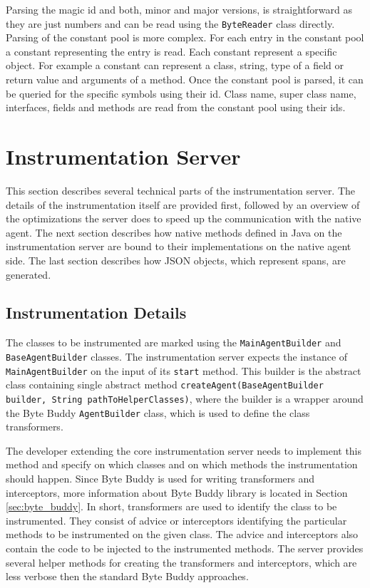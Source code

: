 Parsing the magic id and both, minor and major versions, is straightforward as they are just numbers and can be read using the \texttt{ByteReader} class directly. Parsing of the constant pool is more complex. For each entry in the constant pool a constant representing the entry is read. Each constant represent a specific object. For example a constant can represent a class, string, type of a field or return value and arguments of a method. Once the constant pool is parsed, it can be queried for the specific symbols using their id. Class name, super class name, interfaces, fields and methods are read from the constant pool using their ids.

\section{Instrumentation Server}
This section describes several technical parts of the instrumentation server. The details of the instrumentation itself are provided first, followed by an overview of the optimizations the server does to speed up the communication with the native agent. The next section describes how native methods defined in Java on the instrumentation server are bound to their implementations on the native agent side. The last section describes how JSON objects, which represent spans, are generated.

\subsection{Instrumentation Details}
\label{impl:server:instr}
The classes to be instrumented are marked using the \texttt{MainAgentBuilder} and \texttt{BaseAgentBuilder} classes.
The instrumentation server expects the instance of \texttt{MainAgentBuilder} on the input of its \texttt{start} method. This builder is the abstract class containing single abstract method \texttt{createAgent(BaseAgentBuilder builder, String pathToHelperClasses)}, where the builder is a wrapper \linebreak around the Byte Buddy \texttt{AgentBuilder} class, which is used to define the class transformers.

The developer extending the core instrumentation server needs to implement this method and specify on which classes and on which methods the instrumentation should happen. Since Byte Buddy is used for writing transformers and interceptors, more information about Byte Buddy library is located in Section \ref{sec:byte_buddy}. In short, transformers are used to identify the class to be instrumented. They consist of advice or interceptors identifying the particular methods to be instrumented on the given class. The advice and interceptors also contain the code to be injected to the instrumented methods. The server provides several helper methods for creating the transformers and interceptors, which are less verbose then the standard Byte Buddy approaches.

